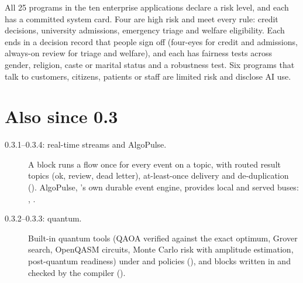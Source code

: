 All 25 programs in the ten enterprise applications declare a risk level, and each has a committed system card. Four are high risk and meet every rule: credit decisions, university admissions, emergency triage and welfare eligibility. Each ends in a decision record that people sign off (four-eyes for credit and admissions, always-on review for triage and welfare), and each has fairness tests across gender, religion, caste or marital status and a robustness test. Six programs that talk to customers, citizens, patients or staff are limited risk and disclose AI use.

\section{Also since 0.3}

\begin{description}
\item[0.3.1--0.3.4: real-time streams and AlgoPulse\texttrademark.] A  block runs a flow once for every event on a topic, with routed result topics (ok, review, dead letter), at-least-once delivery and de-duplication (). AlgoPulse, \algolang's own durable event engine, provides local and served buses: , .
\item[0.3.2--0.3.3: quantum.] Built-in quantum tools (QAOA verified against the exact optimum, Grover search, OpenQASM circuits, Monte Carlo risk with amplitude estimation, post-quantum readiness) under  and  policies (), and  blocks written in \algolang{} and checked by the compiler ().
\end{description}
